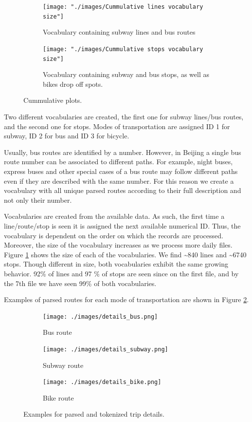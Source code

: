 \documentclass{article}
\begin{document}
\begin{figure}[H]
  \centering
  \begin{subfigure}[b]{.7\textwidth}
  	\centering
  	\texttt{[image: "./images/Cummulative lines vocabulary size"]}
  	\caption{Vocabulary containing subway lines and bus routes}
  \end{subfigure}
  \begin{subfigure}[b]{.7\textwidth}
  	\centering
  	\texttt{[image: "./images/Cummulative stops vocabulary size"]}
  	\caption{Vocabulary containing subway and bus stops, as well as bikes drop off spots.}
  \end{subfigure}
  \caption{Cummulative plots.}
  \label{fig:preprocessing/cummulativeVoc}
\end{figure}

Two different vocabularies are created, the first one for subway lines/bus routes, and the second one for stops. Modes of transportation are assigned ID 1 for subway, ID 2 for bus and ID 3 for bicycle. 

Usually, bus routes are identified by a number. However, in Beijing a single bus route number can be associated to different paths. For example, night buses, express buses and other special cases of a bus route may follow different paths even if they are described with the same number. For this reason we create a vocabulary with all unique parsed routes according to their full description and not only their number. 

Vocabularies are created from the available data. As such, the first time a line/route/stop is seen it is assigned the next available numerical ID. Thus, the vocabulary is dependent on the order on which the records are processed. Moreover, the size of the vocabulary increases as we process more daily files. Figure \ref{fig:preprocessing/cummulativeVoc} shows the size of each of the vocabularies. We find  \textasciitilde 840 lines and \textasciitilde 6740 stops. Though different in size, both vocabularies exhibit the same growing behavior. 92\% of lines and 97 \% of stops are seen since on the first file, and by the 7th file we have seen 99\% of both vocabularies.

Examples of parsed routes for each mode of transportation are shown in Figure \ref{fig:preprocessing/parsed_routes}. 

\begin{figure}[H]
  \centering
  \begin{subfigure}[b]{\textwidth}
  	\centering
  	\texttt{[image: ./images/details\_bus.png]}
  	\caption{Bus route}
  \end{subfigure}
  \begin{subfigure}[b]{.75\textwidth}
  	\centering
  	\texttt{[image: ./images/details\_subway.png]}
  	\caption{Subway route}
  \end{subfigure}
    \begin{subfigure}[b]{.7\textwidth}
  	\centering
  	\texttt{[image: ./images/details\_bike.png]}
  	\caption{Bike route}
  \end{subfigure}
  \caption{Examples for parsed and tokenized trip details.}
  	\label{fig:preprocessing/parsed_routes}
\end{figure}
\end{document}
